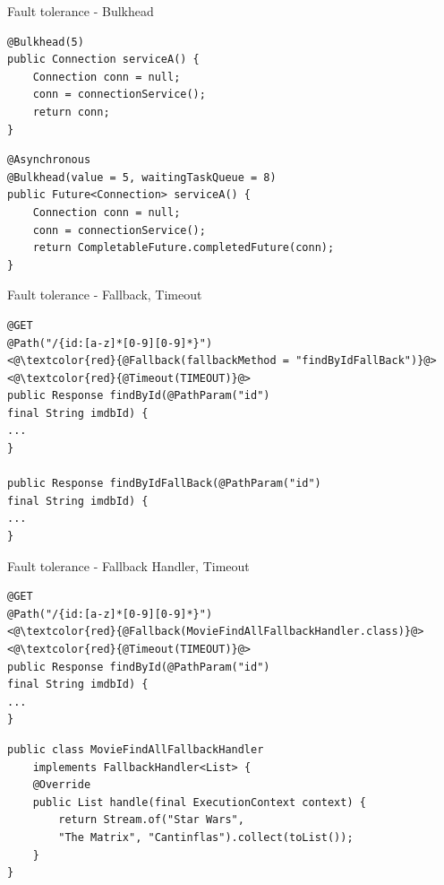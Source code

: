 \documentclass[aspectratio=169]{beamer}
\begin{document}
\begin{frame}[fragile]{Fault tolerance - Bulkhead}
\begin{lstlisting}
@Bulkhead(5)
public Connection serviceA() {
    Connection conn = null;
    conn = connectionService();
    return conn;
}
\end{lstlisting}

\begin{lstlisting}
@Asynchronous
@Bulkhead(value = 5, waitingTaskQueue = 8)
public Future<Connection> serviceA() {
    Connection conn = null;
    conn = connectionService();
    return CompletableFuture.completedFuture(conn);
}

\end{lstlisting}
\end{frame}



\begin{frame}[fragile]{Fault tolerance - Fallback, Timeout}
\begin{lstlisting}
@GET
@Path("/{id:[a-z]*[0-9][0-9]*}")
<@\textcolor{red}{@Fallback(fallbackMethod = "findByIdFallBack")}@>
<@\textcolor{red}{@Timeout(TIMEOUT)}@>
public Response findById(@PathParam("id")
final String imdbId) {
...
}

public Response findByIdFallBack(@PathParam("id")
final String imdbId) {
...
}
\end{lstlisting}
\end{frame}

\begin{frame}[fragile]{Fault tolerance - Fallback Handler, Timeout}
\begin{lstlisting}
@GET
@Path("/{id:[a-z]*[0-9][0-9]*}")
<@\textcolor{red}{@Fallback(MovieFindAllFallbackHandler.class)}@>
<@\textcolor{red}{@Timeout(TIMEOUT)}@>
public Response findById(@PathParam("id")
final String imdbId) {
...
}
\end{lstlisting}
\begin{lstlisting}
public class MovieFindAllFallbackHandler
    implements FallbackHandler<List> {
    @Override
    public List handle(final ExecutionContext context) {
    	return Stream.of("Star Wars",
    	"The Matrix", "Cantinflas").collect(toList());
    }
}
\end{lstlisting}
\end{frame}
\end{document}
